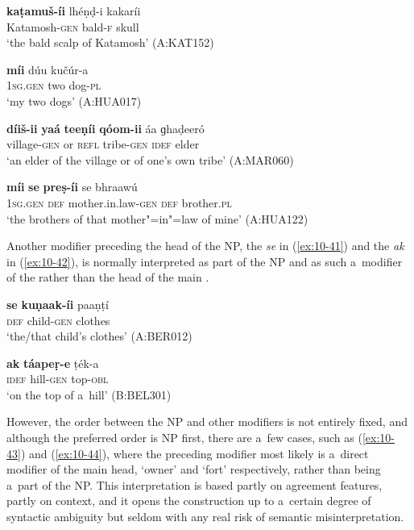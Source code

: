 \begin{exe}
\ex
\label{ex:10-37}
\gll \textbf{kaṭamuš-íi} lhéṇḍ-i kakaríi \\
Katamosh-\textsc{gen} bald-\textsc{f} skull \\
\glt `the bald scalp of Katamosh' (A:KAT152)

\ex
\label{ex:10-38}
\gll \textbf{míi} dúu kučúr-a \\
\textsc{1sg.gen} two dog-\textsc{pl}  \\
\glt `my two dogs' (A:HUA017)

\ex
\label{ex:10-39}
\gll \textbf{díiš-ii} \textbf{yaá} \textbf{teeṇíi} \textbf{qóom-ii} áa ɡhaḍeeró  \\
village-\textsc{gen} or \textsc{refl} tribe-\textsc{gen} \textsc{idef} elder \\
\glt `an elder of the village or of one's own tribe' (A:MAR060)

\ex
\label{ex:10-40}
\gll \textbf{míi} \textbf{se} \textbf{preṣ-íi} se bhraawú \\
\textsc{1sg.gen} \textsc{def} mother.in.law-\textsc{gen} \textsc{def} brother.\textsc{pl}  \\
\glt `the brothers of that mother"=in"=law of mine' (A:HUA122)
\end{exe}


Another modifier preceding the head of the  NP, the  \textit{se} in (\ref{ex:10-41}) and the  \textit{ak} in (\ref{ex:10-42}), is normally interpreted as part of the  NP and as such a~modifier of the   rather than the head of the main  .

\begin{exe}
\ex
\label{ex:10-41}
\gll \textbf{se} \textbf{kuṇaak-íi} paaṇṭí \\
\textsc{def} child-\textsc{gen} clothes  \\
\glt `the/that child's clothes' (A:BER012)

\ex
\label{ex:10-42}
\gll \textbf{ak} \textbf{táapeṛ-e} ṭék-a \\
\textsc{idef} hill-\textsc{gen} top-\textsc{obl}  \\
\glt `on the top of a~hill' (B:BEL301)
\end{exe}


However, the order between the  NP and other modifiers is not entirely fixed, and although the preferred order is  NP first, there are a~few cases, such as (\ref{ex:10-43}) and (\ref{ex:10-44}), where the preceding modifier most likely is a~direct modifier of the main  head, `owner' and `fort' respectively, rather than being a~part of the  NP. This interpretation is based partly on agreement features, partly on context, and it opens the construction up to a~certain degree of syntactic ambiguity but seldom with any real risk of semantic misinterpretation.


